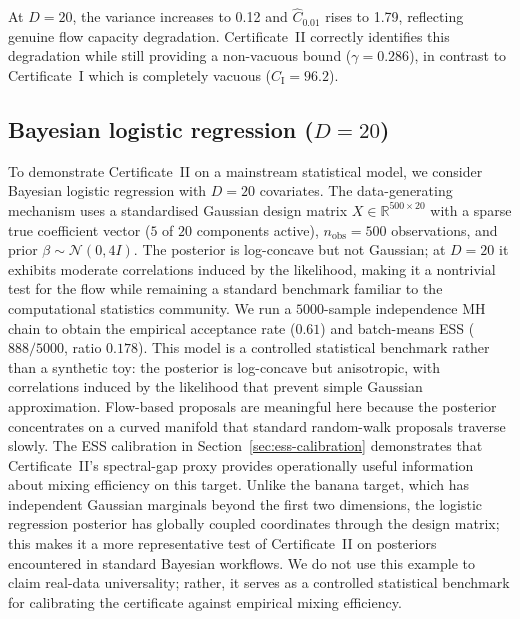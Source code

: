 \documentclass[12pt]{article}
\begin{document}
At $D = 20$, the variance increases to 0.12 and $\hat{C}_{0.01}$ rises to 1.79, reflecting genuine flow capacity degradation.
Certificate~II correctly identifies this degradation while still providing a non-vacuous bound ($\gamma = 0.286$), in contrast to Certificate~I which is completely vacuous ($C_{\mathrm{I}} = 96.2$).


\subsection{Bayesian logistic regression ($D = 20$)}\label{sec:logreg}

To demonstrate Certificate~II on a mainstream statistical model, we consider Bayesian logistic regression with $D = 20$ covariates. The data-generating mechanism uses a standardised Gaussian design matrix $X \in \mathbb{R}^{500 \times 20}$ with a sparse true coefficient vector ($5$ of $20$ components active), $n_{\mathrm{obs}} = 500$ observations, and prior $\beta \sim \mathcal{N}(0, 4I)$. The posterior is log-concave but not Gaussian; at $D = 20$ it exhibits moderate correlations induced by the likelihood, making it a nontrivial test for the flow while remaining a standard benchmark familiar to the computational statistics community. We run a $5000$-sample independence MH chain to obtain the empirical acceptance rate ($0.61$) and batch-means ESS ($888/5000$, ratio $0.178$).
This model is a controlled statistical benchmark rather than a synthetic toy: the posterior is log-concave but anisotropic, with correlations induced by the likelihood that prevent simple Gaussian approximation. Flow-based proposals are meaningful here because the posterior concentrates on a curved manifold that standard random-walk proposals traverse slowly. The ESS calibration in Section~\ref{sec:ess-calibration} demonstrates that Certificate~II's spectral-gap proxy provides operationally useful information about mixing efficiency on this target.
Unlike the banana target, which has independent Gaussian marginals beyond the first two dimensions, the logistic regression posterior has globally coupled coordinates through the design matrix; this makes it a more representative test of Certificate~II on posteriors encountered in standard Bayesian workflows.
We do not use this example to claim real-data universality; rather, it serves as a controlled statistical benchmark for calibrating the certificate against empirical mixing efficiency.
\end{document}
